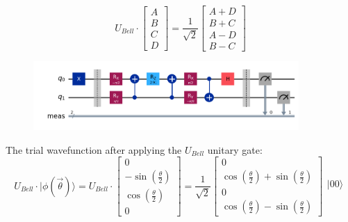 \documentclass{article}
\begin{document}
\begin{itemize}
	      \begin{equation*}
            U_{Bell} \cdot \begin{bmatrix}
			      A \\
			      B \\
			      C \\
			      D
		      \end{bmatrix}
		      =
		      \frac{1}{\sqrt{2}}\begin{bmatrix}
			      A + D \\
			      B + C \\
			      A - D \\
			      B - C
		      \end{bmatrix}
	      \end{equation*}
	      \begin{figure}[H]
		      \centering
		      \includegraphics[width=0.9\textwidth, height=0.25\textheight]{BellM.png}
	      \end{figure}
          The trial wavefunction after applying the \(U_{Bell}\) unitary gate:
          \begin{equation*}
            U_{Bell} \cdot |\phi(\vec{\theta})\rangle = U_{Bell} \cdot \begin{bmatrix}
                0 \\
                -\sin\left(\frac{\theta}{2}\right) \\
                \cos\left(\frac{\theta}{2}\right) \\
                0
            \end{bmatrix}
            = \frac{1}{\sqrt{2}}
            \begin{bmatrix}
                0 \\
                \cos\left(\frac{\theta}{2}\right) + \sin\left(\frac{\theta}{2}\right) \\
                0 \\
                \cos\left(\frac{\theta}{2}\right) - \sin\left(\frac{\theta}{2}\right) 
            \end{bmatrix}
            \begin{array}{c}
                |00 \rangle\\

\end{array}
\end{equation*}
\end{itemize}
\end{document}
